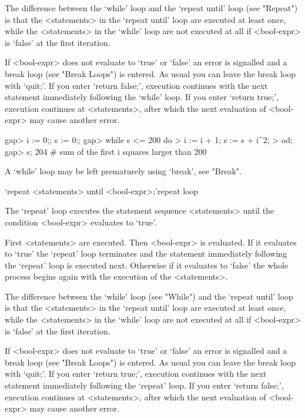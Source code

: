 {The difference between the `while'  loop and the `repeat until' loop
(see "Repeat") is that the <statements> in the `repeat until' loop are
executed at least once, while the <statements> in the `while' loop are
not executed at all if <bool-expr> is `false' at the first iteration.

If <bool-expr> does not evaluate to `true' or `false' an error is
signalled and a break loop (see "Break Loops") is entered. As usual you
can leave the break loop with `quit;'.  If you enter `return false;',
execution continues with the next statement immediately following the
`while' loop.  If you enter `return true;', execution continues at
<statements>, after which the next evaluation of <bool-expr> may cause
another error.

\beginexample
gap> i := 0;; s := 0;;
gap> while s <= 200 do
>    i := i + 1; s := s + i^2;
>  od;
gap> s;
204    # sum of the first i squares larger than 200
\endexample

A `while' loop may be left prematurely using `break', see "Break".



\>`repeat <statements> until <bool-expr>;'{repeat loop}

The `repeat' loop executes the statement sequence <statements> until the
condition <bool-expr> evaluates to `true'.

First <statements> are executed.  Then <bool-expr> is evaluated. If it
evaluates  to `true' the `repeat'  loop terminates and the statement
immediately following the `repeat' loop is executed next. Otherwise if
it evaluates to `false' the whole process begins again with the execution
of the <statements>.

The difference between the `while' loop (see "While") and the `repeat
until' loop is that the <statements> in the `repeat until' loop are
executed at least once, while the <statements> in the `while' loop are
not executed at all if <bool-expr> is `false' at the first iteration.

If <bool-expr> does not evaluate to `true'  or `false' an error is
signalled and a break loop (see "Break Loops") is entered. As usual you
can leave the break loop with `quit;'.  If you enter `return true;',
execution continues with the next statement  immediately following the
`repeat' loop.  If you enter `return  false;', execution continues at
<statements>, after which the next evaluation of <bool-expr> may cause
another error.

}
